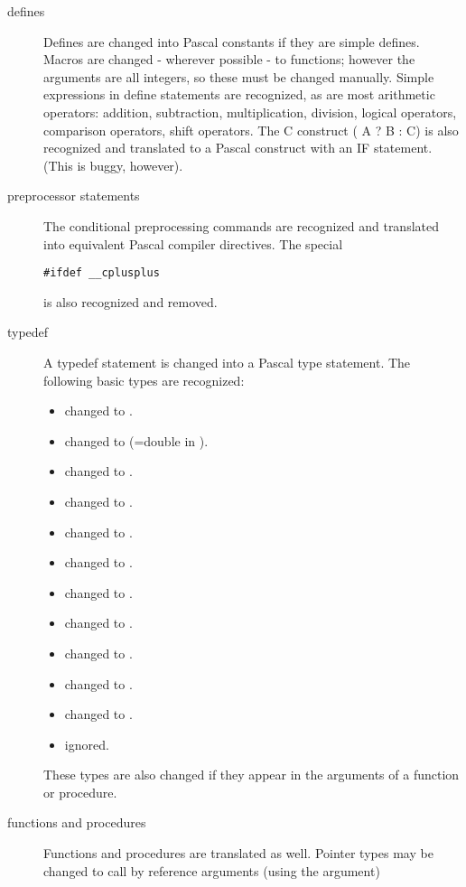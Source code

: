 \begin{description}
\item[defines] 
Defines are changed into Pascal constants if they are simple defines.
Macros are changed - wherever possible - to functions; however the arguments
are all integers, so these must be changed manually. Simple expressions 
in define statements are recognized, as are most arithmetic operators: 
addition, subtraction, multiplication, division, logical operators, 
comparison operators, shift operators. The C construct ( A ? B : C)
is also recognized and translated to a Pascal construct with an IF
statement. (This is buggy, however).

\item[preprocessor statements]
The conditional preprocessing commands are recognized and translated into
equivalent Pascal compiler directives. The special 
\begin{verbatim}
#ifdef __cplusplus
\end{verbatim}
is also recognized and removed.
\item[typedef] A typedef statement is changed into a Pascal type statement. 
The following basic types are recognized:
\begin{itemize}
\item {} changed to .
\item {} changed to  (=double in \fpc).
\item {} changed to .
\item {} changed to .
\item {} changed to .
\item {} changed to . 
\item {} changed to .
\item {} changed to .
\item {} changed to .
\item {} changed to .
\item {} changed to .
\item {} ignored.
\end{itemize}
These types are also changed if they appear in the arguments of a function
or procedure.
\item[functions and procedures]
Functions and procedures are translated as well. Pointer types may be
changed to call by reference arguments (using the  argument) 

\end{description}
